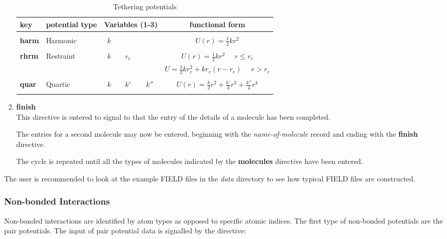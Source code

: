\begin{enumerate}
\begin{table}[ht]
\caption{\label{tethtable} Tethering potentials}     
\vskip 5pt
\begin{centering}
 \begin{tabular}{|l|l|c|c|c|c|}
\hline
key & potential type &
\multicolumn{3}{c|}{Variables (1-3)} & functional form\\
\hline
 & & & & & \\
{\bf harm} & Harmonic & $k$ &  &  &$ U(r)=\frac{1}{2}kr^2$ \\
 & & & & & \\
{\bf rhrm} & Restraint & $k$ & $r_{c}$ & &
$U(r)=\frac{1}{2}kr^2~~~~~~r \le r_{c}$\\
  &  &  &  &  & $U=\frac{1}{2}kr_{c}^2+kr_{c}(r-r_{c})~~~~~~r>r_{c}$\\
 & & & & & \\
{\bf quar} & Quartic & $k$ & $k'$ & $k''$ & $U(r)=\frac{k}{2}r^2+
\frac{k'}{3}r^3+\frac{k''}{4}r^4$\\
 & & & & & \\
\hline
\end{tabular}

\end{centering}

\end{table}

\item {\bf finish}\\
This directive is entered to signal to \D{} that the entry of the
details of a molecule has been completed.

The entries for a second molecule may now be entered, beginning with
the {\em name-of-molecule} record and ending with the {\bf finish}
directive.

The cycle is repeated until all the types of molecules indicated by
the {\bf molecules} directive have been entered.

\end{enumerate}

The user is recommended to look at the example FIELD files in the {\em
data} directory to see how typical FIELD files are constructed.


\subsubsection{Non-bonded Interactions}

Non-bonded interactions are identified by atom types as opposed to
specific atomic indices. The first type of
non-bonded potentials are the pair
potentials. The input of pair potential data is signalled by the
directive:

